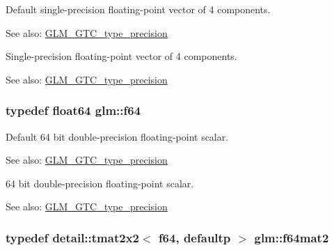 Default single-precision floating-point vector of 4 components. \begin{Desc}
\item[See also:]\hyperlink{group__gtc__type__precision}{GLM\_\-GTC\_\-type\_\-precision}\end{Desc}
Single-precision floating-point vector of 4 components. \begin{Desc}
\item[See also:]\hyperlink{group__gtc__type__precision}{GLM\_\-GTC\_\-type\_\-precision} \end{Desc}
\hypertarget{group__gtc__type__precision_g2bba392e555124b36cde6abba349bab3}{
\subsubsection[f64]{\setlength{\rightskip}{0pt plus 5cm}typedef float64 {\bf glm::f64}}}
\label{group__gtc__type__precision_g2bba392e555124b36cde6abba349bab3}


Default 64 bit double-precision floating-point scalar. \begin{Desc}
\item[See also:]\hyperlink{group__gtc__type__precision}{GLM\_\-GTC\_\-type\_\-precision}\end{Desc}
64 bit double-precision floating-point scalar. \begin{Desc}
\item[See also:]\hyperlink{group__gtc__type__precision}{GLM\_\-GTC\_\-type\_\-precision} \end{Desc}
\hypertarget{group__gtc__type__precision_ga66040c1fd82a9d1f6ac82d4e1e8baa6}{
\subsubsection[f64mat2]{\setlength{\rightskip}{0pt plus 5cm}typedef detail::tmat2x2$<$ f64, defaultp $>$ {\bf glm::f64mat2}}}
\label{group__gtc__type__precision_ga66040c1fd82a9d1f6ac82d4e1e8baa6}


